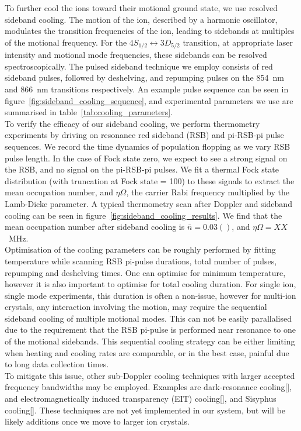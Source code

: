    To further cool the ions toward their motional ground state, we use resolved
    sideband cooling. The motion of the ion, described by a harmonic oscillator,
    modulates the transition frequencies of the ion, leading to sidebands at
    multiples of the motional frequency. For the $4S_{1/2} \leftrightarrow
    3D_{5/2}$ transition, at appropriate laser intensity and motional mode
    frequencies, these sidebands can be resolved spectroscopically. The pulsed
    sideband technique we employ consists of red sideband pulses, followed by
    deshelving, and repumping pulses on the 854~nm and 866~nm transitions
    respectively. An example pulse sequence can be seen in
    figure~\ref{fig:sideband_cooling_sequence}, and experimental parameters we use are summarised in table~\ref{tab:cooling_parameters}.\\
    To verify the efficacy of our sideband cooling, we perform thermometry
    experiments by driving on resonance red sideband (RSB) and pi-RSB-pi pulse
    sequences. We record the time dynamics of population flopping as we vary RSB
    pulse length. In the case of Fock state zero, we expect to see a strong
    signal on the RSB, and no signal on the pi-RSB-pi pulses. We fit a thermal
    Fock state distribution (with truncation at Fock state = 100) to these
    signals to extract the mean occupation number, and $\eta\Omega$, the carrier
    Rabi frequency multiplied by the Lamb-Dicke parameter. A typical thermometry
    scan after Doppler and sideband cooling can be seen in
    figure~\ref{fig:sideband_cooling_results}. We find that the mean occupation
    number after sideband cooling is $\bar{n} = 0.03()$, and $\eta\Omega =
    XX$~MHz.\\
    Optimisation of the cooling parameters can be roughly performed by fitting
    temperature while scanning RSB pi-pulse durations, total number of pulses,
    repumping and deshelving times. One can optimise for minimum temperature,
    however it is also important to optimise for total cooling duration. For
    single ion, single mode experiments, this duration is often a non-issue,
    however for multi-ion crystals, any interaction involving the motion, may
    require the sequential sideband cooling of multiple motional modes. This can
    not be easily parallalised due to the requirement that the RSB pi-pulse is
    performed near resonance to one of the motional sidebands. This sequential
    cooling strategy can be either limiting when heating and cooling rates are
    comparable, or in the best case, painful due to long data collection times.\\
    To mitigate this issue, other sub-Doppler cooling techniques with larger
    accepted frequency bandwidths may be employed. Examples are dark-resonance
    cooling[], and electromagnetically induced transparency (EIT) cooling[], and
    Sisyphus cooling[]. These techniques are not yet implemented in our system,
    but will be likely additions once we move to larger ion crystals.\\

